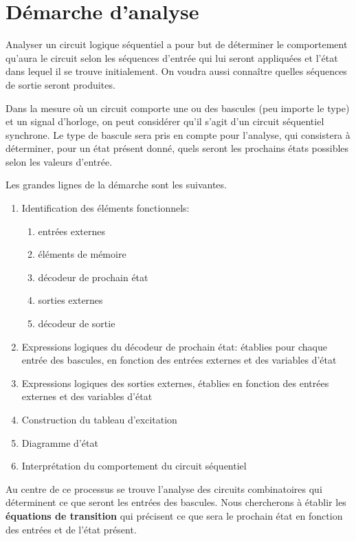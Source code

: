 \documentclass[letter, oneside]{book}
\begin{document}
\section{Démarche d'analyse}
\label{sec:org0dff05d}

Analyser un circuit logique séquentiel a pour but de déterminer le
comportement qu'aura le circuit selon les séquences d'entrée qui lui
seront appliquées et l'état dans lequel il se trouve initialement. On
voudra aussi connaître quelles séquences de sortie seront produites.

Dans la mesure où un circuit comporte une ou des bascules (peu importe
le type) et un signal d'horloge, on peut considérer qu'il s'agit d'un
circuit séquentiel synchrone. Le type de bascule sera pris en compte
pour l'analyse, qui consistera à déterminer, pour un état présent
donné, quels seront les prochains états possibles selon les valeurs
d'entrée.

Les grandes lignes de la démarche sont les suivantes.

\begin{enumerate}
\item Identification des éléments fonctionnels:

\begin{enumerate}
\item entrées externes

\item éléments de mémoire

\item décodeur de prochain état

\item sorties externes

\item décodeur de sortie
\end{enumerate}
\item Expressions logiques du décodeur de prochain état: établies pour
chaque entrée des bascules, en fonction des entrées externes et des
variables d'état
\item Expressions logiques des sorties externes, établies en fonction des
entrées externes et des variables d'état
\item Construction du tableau d'excitation
\item Diagramme d'état
\item Interprétation du comportement du circuit séquentiel
\end{enumerate}

Au centre de ce processus se trouve l'analyse des circuits
combinatoires qui déterminent ce que seront les entrées des
bascules. Nous chercherons à établir les \textbf{équations de transition} qui
précisent ce que sera le prochain état en fonction des entrées et de
l'état présent.
\end{document}
